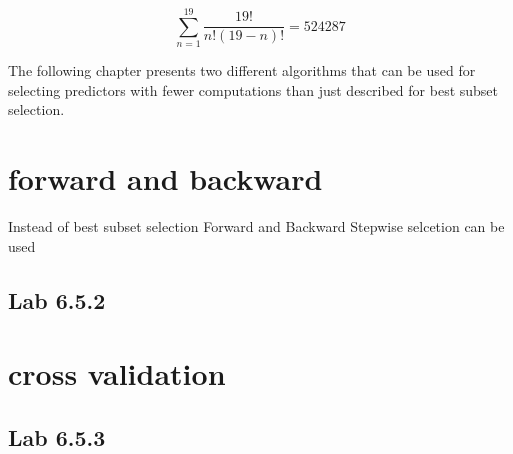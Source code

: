 \begin{equation}
\sum_{n=1}^{19} \dfrac{19!}{n!(19-n)!} = 524287
\end{equation}

The following chapter presents two different algorithms that can be used for selecting predictors with fewer computations than just described for best subset selection.

\section{forward and backward}
Instead of best subset selection Forward and Backward Stepwise selcetion can be used
\subsection{Lab 6.5.2}

\section{cross validation}
\subsection{Lab 6.5.3}